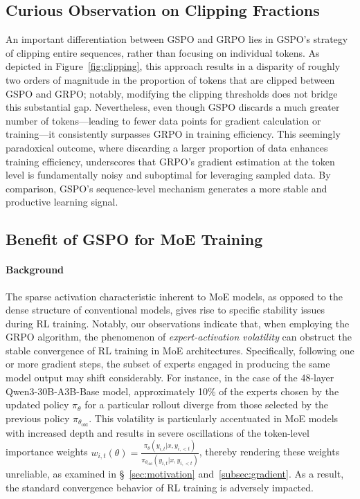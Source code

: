 \subsection{Curious Observation on Clipping Fractions}

An important differentiation between GSPO and GRPO lies in GSPO's strategy of clipping entire sequences, rather than focusing on individual tokens. As depicted in Figure~\ref{fig:clipping}, this approach results in a disparity of roughly two orders of magnitude in the proportion of tokens that are clipped between GSPO and GRPO; notably, modifying the clipping thresholds does not bridge this substantial gap. Nevertheless, even though GSPO discards a much greater number of tokens—leading to fewer data points for gradient calculation or training—it consistently surpasses GRPO in training efficiency. This seemingly paradoxical outcome, where discarding a larger proportion of data enhances training efficiency, underscores that GRPO’s gradient estimation at the token level is fundamentally noisy and suboptimal for leveraging sampled data. By comparison, GSPO's sequence-level mechanism generates a more stable and productive learning signal.

\subsection{Benefit of GSPO for MoE Training}
\label{subsec:routing_replay}

\paragraph{Background}
The sparse activation characteristic inherent to MoE models, as opposed to the dense structure of conventional models, gives rise to specific stability issues during RL training. Notably, our observations indicate that, when employing the GRPO algorithm, the phenomenon of \textit{expert-activation volatility} can obstruct the stable convergence of RL training in MoE architectures. Specifically, following one or more gradient steps, the subset of experts engaged in producing the same model output may shift considerably. For instance, in the case of the 48-layer Qwen3-30B-A3B-Base model, approximately 10\% of the experts chosen by the updated policy $\pi_{\theta}$ for a particular rollout diverge from those selected by the previous policy $\pi_{\theta_\text{old}}$. This volatility is particularly accentuated in MoE models with increased depth and results in severe oscillations of the token-level importance weights $w_{i,t}(\theta) = \frac{ \pi_{\theta} (y_{i,t} | x, y_{i,<t}) }{ \pi_{\theta_\text{old}} (y_{i,t} | x,y_{i,<t})}$, thereby rendering these weights unreliable, as examined in \S~\ref{sec:motivation} and~\ref{subsec:gradient}. As a result, the standard convergence behavior of RL training is adversely impacted.

